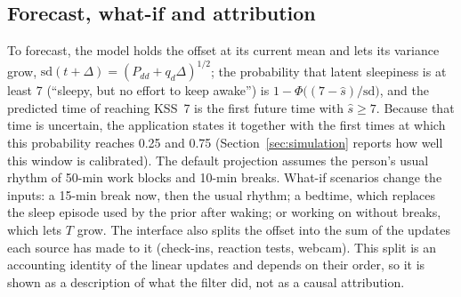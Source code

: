 \subsection{Forecast, what-if and attribution}
To forecast, the model holds the offset at its current mean and lets its variance grow, $\mathrm{sd}(t+\Delta) = (P_{dd} + q_d \Delta)^{1/2}$; the probability that latent sleepiness is at least 7 (``sleepy, but no effort to keep awake'') is $1 - \Phi\big((7 - \hat s)/\mathrm{sd}\big)$, and the predicted time of reaching KSS~7 is the first future time with $\hat s \geq 7$. Because that time is uncertain, the application states it together with the first times at which this probability reaches 0.25 and 0.75 (Section~\ref{sec:simulation} reports how well this window is calibrated). The default projection assumes the person's usual rhythm of 50-min work blocks and 10-min breaks. What-if scenarios change the inputs: a 15-min break now, then the usual rhythm; a bedtime, which replaces the sleep episode used by the prior after waking; or working on without breaks, which lets $T$ grow. The interface also splits the offset into the sum of the updates each source has made to it (check-ins, reaction tests, webcam). This split is an accounting identity of the linear updates and depends on their order, so it is shown as a description of what the filter did, not as a causal attribution.

